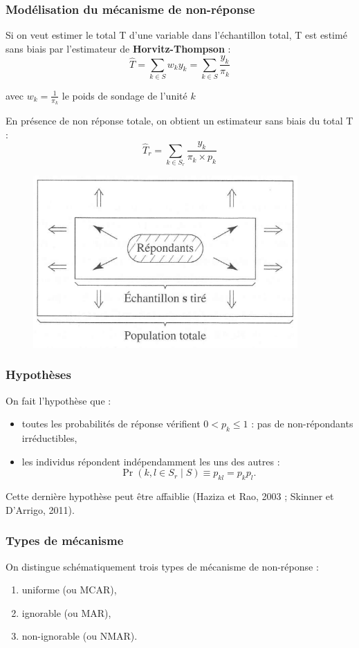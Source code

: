 \begin{frame}
	\frametitle{Modélisation du mécanisme de non-réponse}

Si on veut estimer le total T d'une variable dans l'échantillon total, T est estimé sans biais par l’estimateur de \textbf{Horvitz-Thompson} : $$ \hat{T} = \sum_{k \in S} w_k y_k = \sum_{k \in S} \frac{y_k}{\pi_k}  $$

avec $w_k = \frac{1}{\pi_k}$ le poids de sondage de l’unité $k$ \\  \vspace{0.3cm}

En présence de non réponse totale, on obtient un estimateur sans biais du total T : $$\hat{T}_r =  \sum_{k \in S_r} \frac{y_k}{\pi_k \times p_k}$$
\end{frame}

\begin{frame}{}
	\begin{figure}[h]
		\centering
		\includegraphics[width=0.9\textwidth]{img/s.png}
	\end{figure}
\end{frame}

\begin{frame}
	\frametitle{Hypothèses}



On fait l’hypothèse que :
\begin{itemize}
	\item toutes les probabilités de réponse vérifient $0 < p_k \leq 1$ : pas de non-répondants irréductibles,
	\item les individus répondent indépendamment les uns des autres : 
	\[
	\Pr(k, l \in S_r \mid S) \equiv p_{kl} = p_k p_l.
	\]
\end{itemize}
Cette dernière hypothèse peut être affaiblie (Haziza et Rao, 2003 ; Skinner et D’Arrigo, 2011).


\end{frame}



\begin{frame}
	\frametitle{Types de mécanisme}

On distingue schématiquement trois types de mécanisme de non-réponse :  \\ \vspace{0.5cm}
\begin{enumerate}
	\item uniforme (ou MCAR),
	\item ignorable (ou MAR),
	\item non-ignorable (ou NMAR).
\end{enumerate}

\end{frame}


